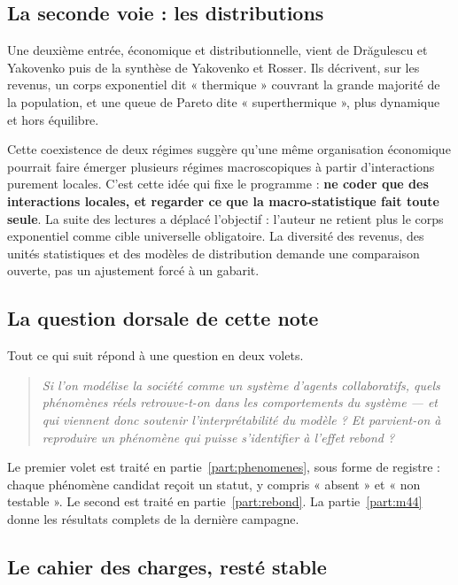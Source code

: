 \documentclass[11pt,a4paper]{article}
\begin{document}
\subsection{La seconde voie : les distributions}

Une deuxième entrée, économique et distributionnelle, vient de
Drăgulescu et Yakovenko puis de la synthèse de Yakovenko et Rosser. Ils
décrivent, sur les revenus, un corps exponentiel dit « thermique » couvrant la
grande majorité de la population, et une queue de Pareto dite
« superthermique », plus dynamique et hors équilibre.

Cette coexistence de deux régimes suggère qu'une même organisation économique
pourrait faire émerger plusieurs régimes macroscopiques à partir
d'interactions purement locales. C'est cette idée qui fixe le programme :
\textbf{ne coder que des interactions locales, et regarder ce que la
macro-statistique fait toute seule}.
La suite des lectures a déplacé l'objectif : l'auteur ne retient plus
le corps exponentiel comme cible universelle obligatoire. La diversité des
revenus, des unités statistiques et des modèles de distribution demande
une comparaison ouverte, pas un ajustement forcé à un gabarit.

\subsection{La question dorsale de cette note}

Tout ce qui suit répond à une question en deux volets.

\begin{quote}
\emph{Si l'on modélise la société comme un système d'agents collaboratifs,
quels phénomènes réels retrouve-t-on dans les comportements du système --- et
qui viennent donc soutenir l'interprétabilité du modèle ? Et parvient-on à
reproduire un phénomène qui puisse s'identifier à l'effet rebond ?}
\end{quote}

Le premier volet est traité en partie~\ref{part:phenomenes}, sous forme de
registre : chaque phénomène candidat reçoit un statut, y compris « absent » et
« non testable ». Le second est traité en partie~\ref{part:rebond}. La
partie~\ref{part:m44} donne les résultats complets de la dernière campagne.

\subsection{Le cahier des charges, resté stable}
\end{document}
